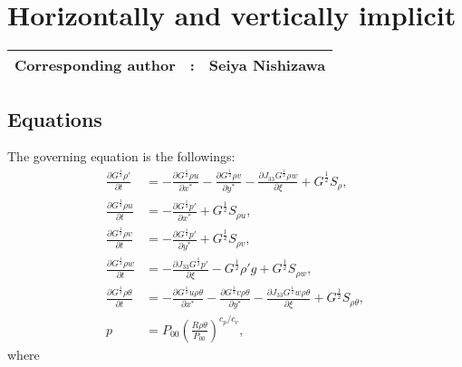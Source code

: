 \chapter{Horizontally and vertically implicit}
\label{chap:hivi}
{\bf \Large 
\begin{tabular}{ccc}
\hline
  Corresponding author & : & Seiya Nishizawa\\
\hline
\end{tabular}
}

\section{Equations}
The governing equation is the followings:
\begin{align}
  \frac{\partial G^{\frac{1}{2}}\rho'}{\partial t} &=
  -\frac{\partial G^{\frac{1}{2}}\rho u}{\partial x^*}
  -\frac{\partial G^{\frac{1}{2}}\rho v}{\partial y^*}
  -\frac{\partial J_{33}G^{\frac{1}{2}}\rho w}{\partial \xi}
  + G^{\frac{1}{2}}S_\rho, \\
  \frac{\partial G^{\frac{1}{2}}\rho u}{\partial t}
  &= -\frac{\partial G^{\frac{1}{2}}p'}{\partial x^*} + G^{\frac{1}{2}}S_{\rho u}, \\
  \frac{\partial G^{\frac{1}{2}}\rho v}{\partial t}
  &= -\frac{\partial G^{\frac{1}{2}}p'}{\partial y^*} + G^{\frac{1}{2}}S_{\rho v}, \\
  \frac{\partial G^{\frac{1}{2}}\rho w}{\partial t}
  &= -\frac{\partial J_{33}G^{\frac{1}{2}}p'}{\partial \xi} -G^{\frac{1}{2}}\rho' g + G^{\frac{1}{2}}S_{\rho w}, \\
  \frac{\partial G^{\frac{1}{2}}\rho\theta}{\partial t} &=
  -\frac{\partial G^{\frac{1}{2}}u \rho \theta}{\partial x^*}
  -\frac{\partial G^{\frac{1}{2}}v \rho \theta}{\partial y^*}
  -\frac{\partial J_{33}G^{\frac{1}{2}}w \rho \theta}{\partial \xi}
  + G^{\frac{1}{2}}S_{\rho\theta}, \\
  p &= P_{00}\left(\frac{R\rho\theta}{P_{00}}\right)^{c_p/c_v},
\end{align}
where
